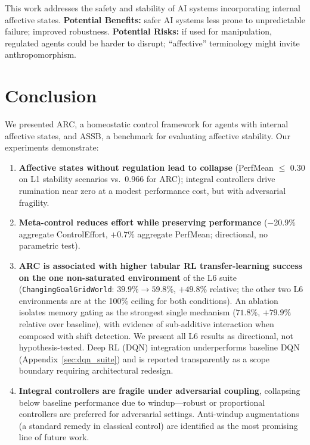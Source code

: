 \documentclass{article}
\begin{document}
This work addresses the safety and stability of AI systems incorporating internal affective states. \textbf{Potential Benefits:} safer AI systems less prone to unpredictable failure; improved robustness. \textbf{Potential Risks:} if used for manipulation, regulated agents could be harder to disrupt; ``affective'' terminology might invite anthropomorphism.

\section{Conclusion}

We presented ARC, a homeostatic control framework for agents with internal affective states, and ASSB, a benchmark for evaluating affective stability. Our experiments demonstrate:
\begin{enumerate}
    \item \textbf{Affective states without regulation lead to collapse} (PerfMean $\leq$ 0.30 on L1 stability scenarios vs.\ 0.966 for ARC); integral controllers drive rumination near zero at a modest performance cost, but with adversarial fragility.
    \item \textbf{Meta-control reduces effort while preserving performance} ($-$20.9\% aggregate ControlEffort, $+0.7\%$ aggregate PerfMean; directional, no parametric test).
    \item \textbf{ARC is associated with higher tabular RL transfer-learning success on the one non-saturated environment} of the L6 suite (\texttt{ChangingGoalGridWorld}: $39.9\% \rightarrow 59.8\%$, $+49.8\%$ relative; the other two L6 environments are at the 100\% ceiling for both conditions). An ablation isolates memory gating as the strongest single mechanism ($71.8\%$, $+79.9\%$ relative over baseline), with evidence of sub-additive interaction when composed with shift detection. We present all L6 results as directional, not hypothesis-tested. Deep RL (DQN) integration underperforms baseline DQN (Appendix~\ref{sec:dqn_suite}) and is reported transparently as a scope boundary requiring architectural redesign.
    \item \textbf{Integral controllers are fragile under adversarial coupling}, collapsing below baseline performance due to windup---robust or proportional controllers are preferred for adversarial settings. Anti-windup augmentations (a standard remedy in classical control) are identified as the most promising line of future work.
\end{enumerate}
\end{document}

